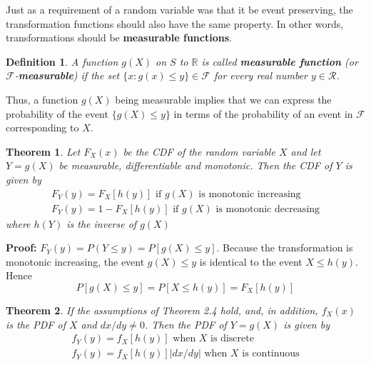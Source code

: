 \documentclass{article}
\newtheorem{definition}{Definition}[section]
\newtheorem{theorem}{Theorem}[section]
\begin{document}
Just as a requirement of a random variable was that it be event preserving, the transformation functions should also have the same property. In other words, transformations should be \textbf{measurable functions}.

\begin{definition}
    A function \(g(X)\) on \(S\) to \(\mathbb{R}\) is called \textbf{measurable function} (or $\mathcal{F}$-\textbf{measurable}) if the set \(\{x:g(x) \leq y\} \in \mathcal{F}\) for every real number \(y \in \mathcal{R}\).
\end{definition}

Thus, a function \(g(X)\) being measurable implies that we can express the probability of the event \(\{g(X) \leq y\}\) in terms of the probability of an event in $\mathcal{F}$ corresponding to \(X\).

\begin{theorem}
    Let \(F_X(x)\) be the CDF of the random variable \(X\) and let \(Y=g(X)\) be measurable, differentiable and monotonic. Then the CDF of \(Y\) is given by
    \begin{equation*}
    \begin{split}
        F_Y(y)=F_X[h(y)] \text{ if } g(X) \text{ is monotonic increasing} \\
         F_Y(y)=1-F_X[h(y)] \text{ if } g(X) \text{ is monotonic decreasing}
    \end{split}
    \end{equation*}
    where \(h(Y)\) is the inverse of \(g(X)\)
\end{theorem}

\textbf{Proof:} \(F_Y(y)= P(Y \leq y) = P[g(X) \leq y]\). Because the transformation is monotonic increasing, the event \(g(X) \leq y\) is identical to the event \(X \leq h(y)\). Hence 
\begin{equation*}
    P[g(X) \leq y] = P[X \leq h(y)] = F_X[h(y)]
\end{equation*}

\begin{theorem}
    If the assumptions of Theorem 2.4 hold, and, in addition, \(f_X(x)\) is the PDF of \(X\) and \(dx/dy \neq 0\). Then the PDF of \(Y=g(X)\) is given by
    \begin{equation*}
        \begin{split}
            f_Y(y)=f_X[h(y)] \text{ when \(X\) is discrete} \\
            f_Y(y)=f_X[h(y)] \left|dx/dy\right| \text{ when \(X\) is continuous}
        \end{split}
    \end{equation*}
\end{theorem}
\end{document}

